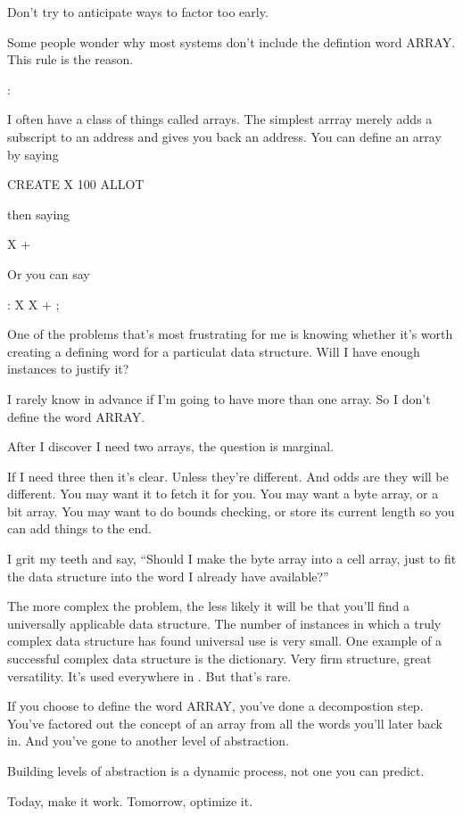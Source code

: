 \begin{tip}
Don't try to anticipate ways to factor too early.
\end{tip}%
Some people wonder why most \Forth{} systems don't include the defintion word ARRAY. This rule is the reason.
\begin{interview}
:
\begin{tfquot}
I often have a class of things called arrays. The simplest arrray
merely adds a subscript to an address and gives you back an
address. You can define an array by saying
\begin{Code}
CREATE X   100 ALLOT
\end{Code}
then saying
\begin{Code}
X +
\end{Code}
Or you can say
\begin{Code}
: X   X + ;
\end{Code}
One of the problems that's most frustrating for me is knowing whether
it's worth creating a defining word for a particulat data
structure. Will I have enough instances to justify it?

I rarely know in advance if I'm going to have more than one array. So
I don't define the word ARRAY.

After I discover I need two arrays, the question is marginal.

If I need three then it's clear. Unless they're different. And odds
are they will be different. You may want it to fetch it for you. You
may want a byte array, or a bit array. You may want to do bounds
checking, or store its current length so you can add things to the
end.

I grit my teeth and say, ``Should I make the byte array into a cell
array, just to fit the data structure into the word I already have
available?''

The more complex the problem, the less likely it will be that you'll
find a universally applicable data structure. The number of instances
in which a truly complex data structure has found universal use is
very small. One example of a successful complex data structure is the
\Forth{} dictionary. Very firm structure, great versatility. It's used
everywhere in \Forth{}. But that's rare.

If you choose to define the word ARRAY, you've done a decompostion
step. You've factored out the concept of an array from all the words
you'll later back in. And you've gone to another
level of abstraction.

Building levels of abstraction is a dynamic process,
not one you can predict.
\end{tfquot}
\end{interview}%
\begin{tip}
Today, make it work. Tomorrow, optimize it.
\end{tip}

